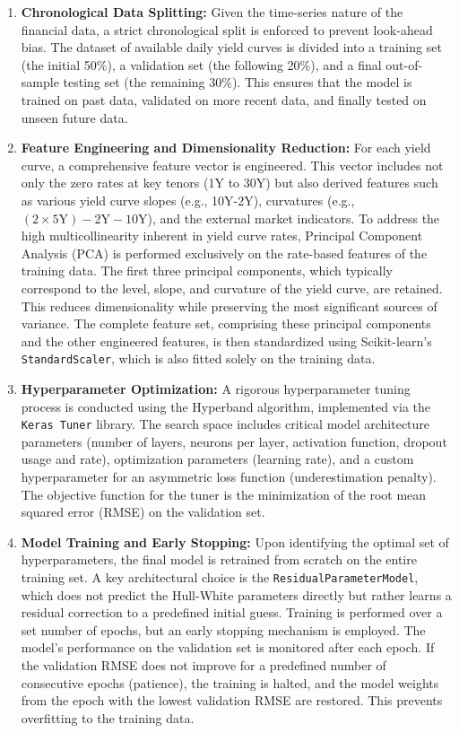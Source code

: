 {\begin{enumerate}
	\item \textbf{Chronological Data Splitting:}
	      Given the time-series nature of the financial data, a strict chronological split is enforced to prevent look-ahead bias. The dataset of available daily yield curves is divided into a training set (the initial 50\%), a validation set (the following 20\%), and a final out-of-sample testing set (the remaining 30\%). This ensures that the model is trained on past data, validated on more recent data, and finally tested on unseen future data.

	\item \textbf{Feature Engineering and Dimensionality Reduction:}
	      For each yield curve, a comprehensive feature vector is engineered. This vector includes not only the zero rates at key tenors (1Y to 30Y) but also derived features such as various yield curve slopes (e.g., 10Y-2Y), curvatures (e.g., $(2 \times 5\text{Y}) - 2\text{Y} - 10\text{Y}$), and the external market indicators. To address the high multicollinearity inherent in yield curve rates, Principal Component Analysis (PCA) is performed exclusively on the rate-based features of the training data. The first three principal components, which typically correspond to the level, slope, and curvature of the yield curve, are retained. This reduces dimensionality while preserving the most significant sources of variance. The complete feature set, comprising these principal components and the other engineered features, is then standardized using Scikit-learn's \texttt{StandardScaler}, which is also fitted solely on the training data.

	\item \textbf{Hyperparameter Optimization:}
	      A rigorous hyperparameter tuning process is conducted using the Hyperband algorithm, implemented via the \texttt{Keras Tuner} library. The search space includes critical model architecture parameters (number of layers, neurons per layer, activation function, dropout usage and rate), optimization parameters (learning rate), and a custom hyperparameter for an asymmetric loss function (underestimation penalty). The objective function for the tuner is the minimization of the root mean squared error (RMSE) on the validation set.

	\item \textbf{Model Training and Early Stopping:}
	      Upon identifying the optimal set of hyperparameters, the final model is retrained from scratch on the entire training set. A key architectural choice is the \texttt{ResidualParameterModel}, which does not predict the Hull-White parameters directly but rather learns a residual correction to a predefined initial guess. Training is performed over a set number of epochs, but an early stopping mechanism is employed. The model's performance on the validation set is monitored after each epoch. If the validation RMSE does not improve for a predefined number of consecutive epochs (patience), the training is halted, and the model weights from the epoch with the lowest validation RMSE are restored. This prevents overfitting to the training data.


\end{enumerate}}
